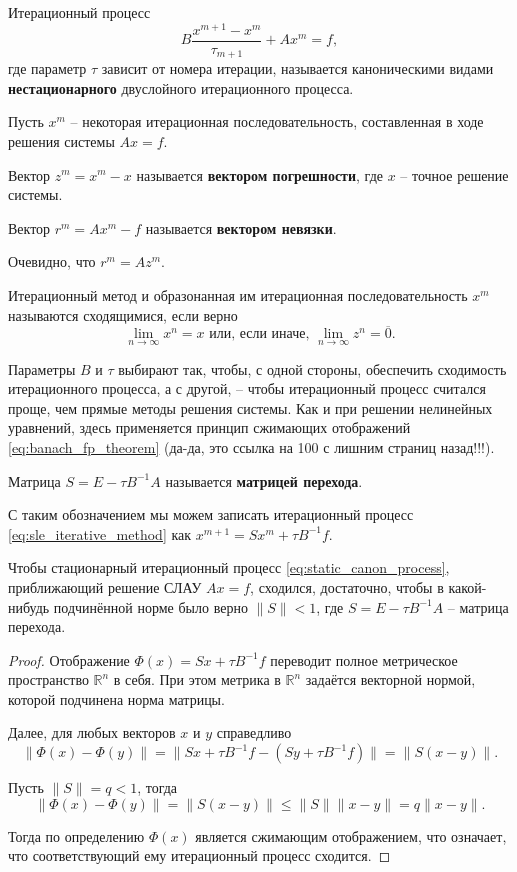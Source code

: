 \documentclass{article}
\begin{document}
\begin{define}
	Итерационный процесс
	\[B\frac{x^{m+1}-x^m}{\tau_{m+1}}+Ax^m=f,\]
	где параметр $\tau$ зависит от номера итерации, называется каноническими
	видами \textbf{нестационарного} двуслойного итерационного процесса.
\end{define}

\begin{define}
	Пусть $x^m$ -- некоторая итерационная последовательность, составленная
	в ходе решения системы $Ax=f$.

	Вектор $z^m=x^m-x$ называется \textbf{вектором погрешности}, где $x$ --
	точное решение системы.

	Вектор $r^m=Ax^m-f$ называется \textbf{вектором невязки}.
\end{define}

Очевидно, что $r^m=Az^m$.

\begin{define}
	Итерационный метод и образонанная им итерационная последовательность
	$x^m$ называются сходящимися, если верно
	\[\lim_{n\to\infty}x^n=x\text{ или, если иначе, }
	\lim_{n\to\infty}z^n=\overline{0}.\]
\end{define}

Параметры $B$ и $\tau$ выбирают так, чтобы, с одной стороны, обеспечить
сходимость итерационного процесса, а с другой, -- чтобы итерационный процесс
считался проще, чем прямые методы решения системы. Как и при решении нелинейных
уравнений, здесь применяется принцип сжимающих отображений
\eqref{eq:banach_fp_theorem} (да-да, это ссылка на 100 с лишним страниц
назад!!!).

\begin{define}
	Матрица $S=E-\tau B^{-1}A$ называется \textbf{матрицей перехода}.
\end{define}

С таким обозначением мы можем записать итерационный процесс
\eqref{eq:sle_iterative_method} как $x^{m+1}=Sx^m+\tau B^{-1}f$.

\begin{theorem}
	Чтобы стационарный итерационный процесс
	\eqref{eq:static_canon_process}, приближающий решение СЛАУ $Ax=f$,
	сходился, достаточно, чтобы в какой-нибудь подчинённой норме было верно
	$\|S\|<1$, где $S=E-\tau B^{-1}A$ -- матрица перехода.
\end{theorem}

\begin{proof}
	Отображение $\Phi(x)=Sx+\tau B^{-1}f$ переводит полное метрическое
	пространство $\mathbb R^n$ в себя. При этом метрика в $\mathbb R^n$
	задаётся векторной нормой, которой подчинена норма матрицы.

	Далее, для любых векторов $x$ и $y$ справедливо
	\[\|\Phi(x)-\Phi(y)\|=\|Sx+\tau B^{-1}f-(Sy+\tau B^{-1}f)\|=
	\|S(x-y)\|.\]

	Пусть $\|S\|=q<1$, тогда
	\[\|\Phi(x)-\Phi(y)\|=\|S(x-y)\|\le\|S\|\|x-y\|=q\|x-y\|.\]

	Тогда по определению $\Phi(x)$ является сжимающим отображением, что
	означает, что соответствующий ему итерационный процесс сходится.
\end{proof}
\end{document}
